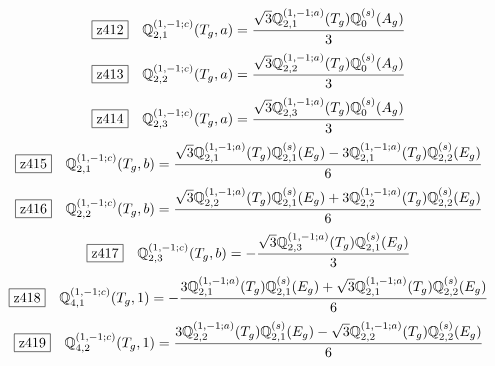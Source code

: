 \documentclass[fleqn,10pt,landscape]{jsarticle}
\begin{document}
\begin{dmath*}
\hspace*{3mm}\fbox{z412}\quad \mathbb{Q}_{2,1}^{(1,-1;c)}(T_{g},a)=\frac{\sqrt{3} \mathbb{Q}_{2,1}^{(1,-1;a)}(T_{g}) \mathbb{Q}_{0}^{(s)}(A_{g})}{3}
\end{dmath*}
\begin{dmath*}
\hspace*{3mm}\fbox{z413}\quad \mathbb{Q}_{2,2}^{(1,-1;c)}(T_{g},a)=\frac{\sqrt{3} \mathbb{Q}_{2,2}^{(1,-1;a)}(T_{g}) \mathbb{Q}_{0}^{(s)}(A_{g})}{3}
\end{dmath*}
\begin{dmath*}
\hspace*{3mm}\fbox{z414}\quad \mathbb{Q}_{2,3}^{(1,-1;c)}(T_{g},a)=\frac{\sqrt{3} \mathbb{Q}_{2,3}^{(1,-1;a)}(T_{g}) \mathbb{Q}_{0}^{(s)}(A_{g})}{3}
\end{dmath*}
\begin{dmath*}
\hspace*{3mm}\fbox{z415}\quad \mathbb{Q}_{2,1}^{(1,-1;c)}(T_{g},b)=\frac{\sqrt{3} \mathbb{Q}_{2,1}^{(1,-1;a)}(T_{g}) \mathbb{Q}_{2,1}^{(s)}(E_{g}) - 3 \mathbb{Q}_{2,1}^{(1,-1;a)}(T_{g}) \mathbb{Q}_{2,2}^{(s)}(E_{g})}{6}
\end{dmath*}
\begin{dmath*}
\hspace*{3mm}\fbox{z416}\quad \mathbb{Q}_{2,2}^{(1,-1;c)}(T_{g},b)=\frac{\sqrt{3} \mathbb{Q}_{2,2}^{(1,-1;a)}(T_{g}) \mathbb{Q}_{2,1}^{(s)}(E_{g}) + 3 \mathbb{Q}_{2,2}^{(1,-1;a)}(T_{g}) \mathbb{Q}_{2,2}^{(s)}(E_{g})}{6}
\end{dmath*}
\begin{dmath*}
\hspace*{3mm}\fbox{z417}\quad \mathbb{Q}_{2,3}^{(1,-1;c)}(T_{g},b)=- \frac{\sqrt{3} \mathbb{Q}_{2,3}^{(1,-1;a)}(T_{g}) \mathbb{Q}_{2,1}^{(s)}(E_{g})}{3}
\end{dmath*}
\begin{dmath*}
\hspace*{3mm}\fbox{z418}\quad \mathbb{Q}_{4,1}^{(1,-1;c)}(T_{g},1)=- \frac{3 \mathbb{Q}_{2,1}^{(1,-1;a)}(T_{g}) \mathbb{Q}_{2,1}^{(s)}(E_{g}) + \sqrt{3} \mathbb{Q}_{2,1}^{(1,-1;a)}(T_{g}) \mathbb{Q}_{2,2}^{(s)}(E_{g})}{6}
\end{dmath*}
\begin{dmath*}
\hspace*{3mm}\fbox{z419}\quad \mathbb{Q}_{4,2}^{(1,-1;c)}(T_{g},1)=\frac{3 \mathbb{Q}_{2,2}^{(1,-1;a)}(T_{g}) \mathbb{Q}_{2,1}^{(s)}(E_{g}) - \sqrt{3} \mathbb{Q}_{2,2}^{(1,-1;a)}(T_{g}) \mathbb{Q}_{2,2}^{(s)}(E_{g})}{6}
\end{dmath*}
\end{document}

